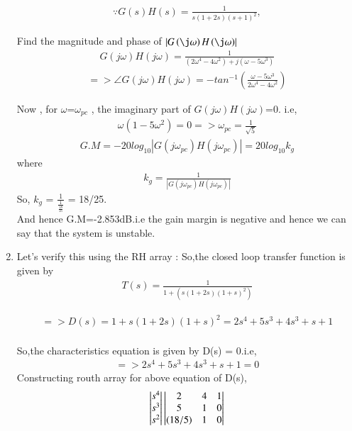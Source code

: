 \begin{enumerate}[label=\thesection.\arabic*.,ref=\thesection.\theenumi]
\begin{align}
\because G(s)H(s)=\frac{1}{s(1+2s)(s+1)^{2}},
\end{align}

Find the magnitude and phase of $\abs{G\brak{\j\omega}H\brak{\j\omega}}$
\begin{align}
G(j\omega)H(j\omega) = \frac{1}{(2\omega^4-4\omega^2) +j(\omega-5\omega^3)}
\end{align}
\begin{align}
=> \angle G(j\omega)H(j\omega) = -tan^{-1}(\frac{\omega-5\omega^3}{2\omega^4-4\omega^2})
\end{align}

Now , for $\omega$=$\omega_{pc}$ , the imaginary part of $G(j\omega)H(j\omega)$=0. i.e,
\begin{align}
\omega(1-5\omega^2)=0
=>\omega_{pc} = \frac{1}{\sqrt{5}}
\end{align}
\begin{align}
G.M = -20log_{10}|G(j\omega_{pc})H(j\omega_{pc})| = 20log_{10}k_{g}
\end{align}
where 
\begin{align}
k_{g}=\frac{1}{|G(j\omega_{pc})H(j\omega_{pc})|}
\end{align}
So, $k_{g}$ = $\frac{1}{\frac{1}{\frac{18}{25}}}$ = 18/25.
\\

And hence G.M=-2.853dB.i.e the gain margin is negative and hence we can say that the system is unstable.

\item 
Let's verify this using the RH array :
So,the closed loop transfer function is given by 
\begin{align}
T(s) = \frac{1}{1 + (s(1+2s)(1+s)^2)}
\end{align}

\begin{align}
=> D(s) = 1 + s(1+2s)(1+s)^2 = 2s^4+5s^3+4s^3+s+1
\end{align}
\\
So,the characteristics equation is given by D(s) = 0.i.e,
\begin{align}
=> 2s^4 + 5s^3 + 4s^3 + s + 1 = 0 
\end{align}
Constructing routh array for above equation of D(s),
\begin{align}
\begin{vmatrix}s^4\\s^3\\s^2\end{vmatrix}
\begin{vmatrix}2 & 4 & 1 \\ 5 & 1 & 0 \\ (18/5) & 1 & 0\end{vmatrix}
\end{align}


\end{enumerate}
